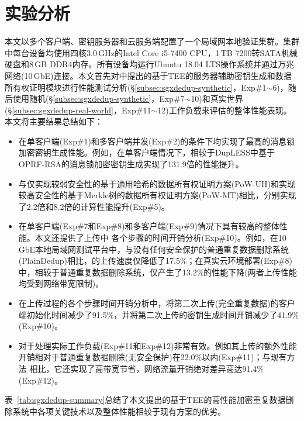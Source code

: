 \section{实验分析}
\label{sec:sgxdedup-evaluation}

本文以多个客户端、密钥服务器和云服务端配置了一个局域网本地验证集群。集群中每台设备均使用四核3.0\,GHz的Intel Core i5-7400 CPU，1\,TB 7200转SATA机械硬盘和8\,GB DDR4内存。所有设备均运行Ubuntu 18.04 LTS操作系统并通过万兆网络(10\,GbE)连接。本文首先对\sysnameS 中提出的基于TEE的服务器辅助密钥生成和数据所有权证明模块进行性能测试分析(\S\ref{subsec:sgxdedup-synthetic}，Exp\#1$\sim$6)，随后使用随机(\S\ref{subsec:sgxdedup-synthetic}，Exp\#7$\sim$10)和真实世界(\S\ref{subsec:sgxdedup-real-world}，Exp\#11$\sim$12)工作负载来评估\sysnameS 的整体性能表现。本文将主要结果总结如下：

\begin{itemize}[leftmargin=0em]
  \item \sysnameS 在单客户端(Exp\#1)和多客户端并发(Exp\#2)的条件下均实现了最高的消息锁加密密钥生成性能。例如，在单客户端情况下，相较于DupLESS中基于OPRF-RSA的消息锁加密密钥生成实现了131.9倍的性能提升。
  \item \sysnameS 与仅实现较弱安全性的基于通用哈希的数据所有权证明方案(PoW-UH)和实现较高安全性的基于Merkle树的数据所有权证明方案(PoW-MT)相比，分别实现了2.2倍和8.2倍的计算性能提升(Exp\#5)。
  \item \sysnameS 在单客户端(Exp\#7和Exp\#8)和多客户端(Exp\#9)情况下具有较高的整体性能。本文还提供了上传中 \sysnameS 各个步骤的时间开销分析(Exp\#10)。例如，在10\,GbE本地局域网测试平台中，与没有任何安全保护的普通重复数据删除系统(PlainDedup)相比，\sysnameS 的上传速度仅降低了17.5\%；在真实云环境部署(Exp\#8)中，相较于普通重复数据删除系统，\sysnameS 仅产生了13.2\%的性能下降(两者上传性能均受到网络带宽限制)。
  \item 在上传过程的各个步骤时间开销分析中，\sysnameS 将第二次上传(完全重复数据)的客户端初始化时间减少了91.5\%，并将第二次上传的密钥生成时间开销减少了41.9\%(Exp\#10)。
  \item \sysnameS 对于处理实际工作负载(Exp\#11和Exp\#12)非常有效。例如其上传的额外性能开销相对于普通重复数据删除(无安全保护)在22.0\%以内(Exp\#11)；与现有方法 相比，它还实现了高带宽节省，网络流量开销绝对差异高达91.4\%(Exp\#12)。
\end{itemize}

表~\ref{tab:sgxdedup-summary}总结了本文提出的基于TEE的高性能加密重复数据删除系统\sysnameS 中各项关键技术以及整体性能相较于现有方案的优劣。

